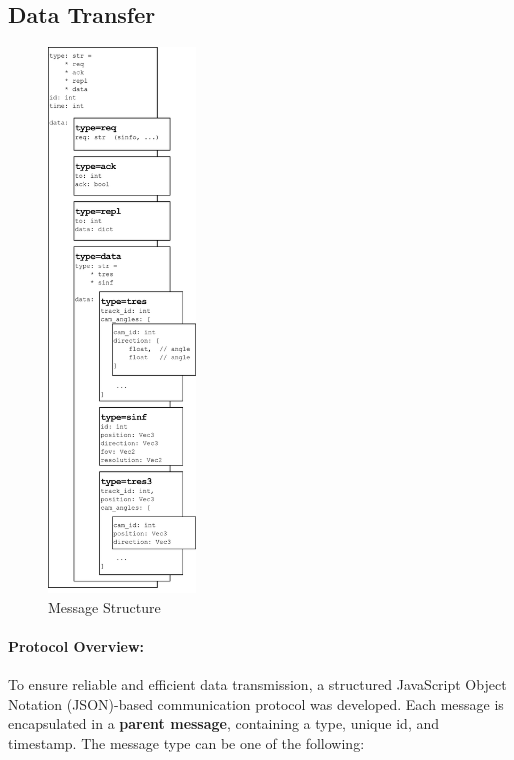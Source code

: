 \newpage

\subsection{Data Transfer}\label{subsec:DataTransfer}

\begin{figure}
	\centering
	\vspace{-60pt} %
	\includegraphics[width=0.35\textwidth]{figures/SS_Protocol_Message}
	\caption{Message Structure}
	\label{fig:ssprotocolmessage}
\end{figure}


\paragraph{Protocol Overview:}

To ensure reliable and efficient data transmission, a structured JavaScript Object Notation (JSON)-based communication protocol was developed. Each message is encapsulated in a \textbf{parent message}, containing a type, unique \acrfull{id}, and timestamp. The message type can be one of the following:

